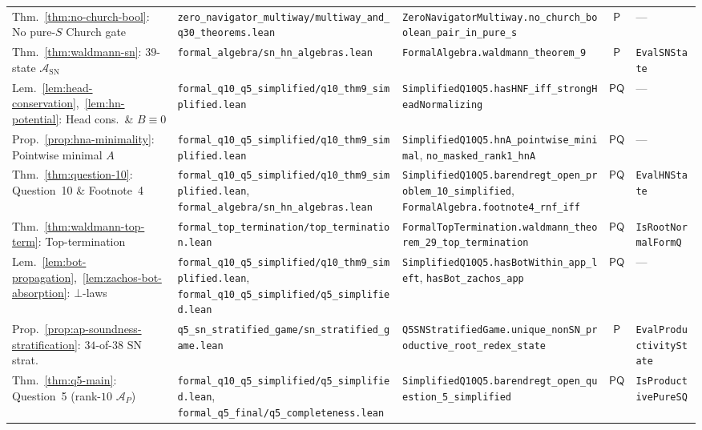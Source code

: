 \documentclass[11pt,reqno]{amsart}
\numberwithin{equation}{section}
\theoremstyle{plain}
\theoremstyle{definition}
\theoremstyle{remark}
\newcommand{\SN}{\mathrm{SN}}
\begin{document}
\begin{table}[htbp]
\begin{tabular}{@{}lllcl@{}}
Thm.~\ref{thm:no-church-bool}: No pure-$S$ Church gate & \texttt{zero\_navigator\_multiway/multiway\_and\_q30\_theorems.lean} & \texttt{ZeroNavigatorMultiway.no\_church\_boolean\_pair\_in\_pure\_s} & $\mathsf{P}$ & --- \\
Thm.~\ref{thm:waldmann-sn}: $39$-state $\mathcal{A}_{\SN}$ & \texttt{formal\_algebra/sn\_hn\_algebras.lean} & \texttt{FormalAlgebra.waldmann\_theorem\_9} & $\mathsf{P}$ & \texttt{EvalSNState} \\
Lem.~\ref{lem:head-conservation},~\ref{lem:hn-potential}: Head cons.\ \& $B\equiv 0$ & \texttt{formal\_q10\_q5\_simplified/q10\_thm9\_simplified.lean} & \texttt{SimplifiedQ10Q5.hasHNF\_iff\_strongHeadNormalizing} & $\mathsf{PQ}$ & --- \\
Prop.~\ref{prop:hna-minimality}: Pointwise minimal $A$ & \texttt{formal\_q10\_q5\_simplified/q10\_thm9\_simplified.lean} & \texttt{SimplifiedQ10Q5.hnA\_pointwise\_minimal}, \texttt{no\_masked\_rank1\_hnA} & $\mathsf{PQ}$ & --- \\
Thm.~\ref{thm:question-10}: Question~10 \& Footnote~4 & \texttt{formal\_q10\_q5\_simplified/q10\_thm9\_simplified.lean}, \texttt{formal\_algebra/sn\_hn\_algebras.lean} & \texttt{SimplifiedQ10Q5.barendregt\_open\_problem\_10\_simplified}, \texttt{FormalAlgebra.footnote4\_rnf\_iff} & $\mathsf{PQ}$ & \texttt{EvalHNState} \\
Thm.~\ref{thm:waldmann-top-term}: Top-termination & \texttt{formal\_top\_termination/top\_termination.lean} & \texttt{FormalTopTermination.waldmann\_theorem\_29\_top\_termination} & $\mathsf{PQ}$ & \texttt{IsRootNormalFormQ} \\
Lem.~\ref{lem:bot-propagation},~\ref{lem:zachos-bot-absorption}: $\bot$-laws & \texttt{formal\_q10\_q5\_simplified/q10\_thm9\_simplified.lean}, \texttt{formal\_q10\_q5\_simplified/q5\_simplified.lean} & \texttt{SimplifiedQ10Q5.hasBotWithin\_app\_left}, \texttt{hasBot\_zachos\_app} & $\mathsf{PQ}$ & --- \\
Prop.~\ref{prop:ap-soundness-stratification}: $34$-of-$38$ $\SN$ strat. & \texttt{q5\_sn\_stratified\_game/sn\_stratified\_game.lean} & \texttt{Q5SNStratifiedGame.unique\_nonSN\_productive\_root\_redex\_state} & $\mathsf{P}$ & \texttt{EvalProductivityState} \\
Thm.~\ref{thm:q5-main}: Question~5 (rank-$10$ $\mathcal{A}_P$) & \texttt{formal\_q10\_q5\_simplified/q5\_simplified.lean}, \texttt{formal\_q5\_final/q5\_completeness.lean} & \texttt{SimplifiedQ10Q5.barendregt\_open\_question\_5\_simplified} & $\mathsf{PQ}$ & \texttt{IsProductivePureSQ} \\

\end{tabular}
\end{table}
\end{document}
